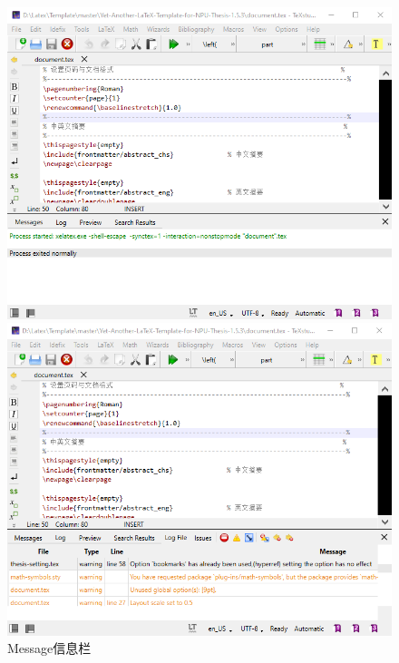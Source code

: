 \documentclass[12pt]{book}
\begin{document}
\begin{figure}[htbp]
     \centering
     \begin{minipage}[c]{0.45\linewidth}
          \includegraphics[scale=0.4]{texstudio-message.png}
     \end{minipage}
     \begin{minipage}[c]{0.4\linewidth}
          \includegraphics[scale=0.4]{texstudio-error.png}
     \end{minipage}
     \caption{Message信息栏}
\end{figure}
\end{document}
